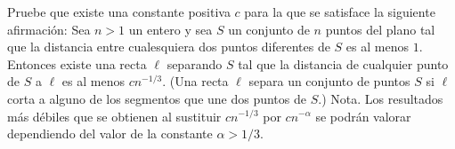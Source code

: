 Pruebe que existe una constante positiva $c$ para la que se satisface la siguiente afirmación:
Sea $n \gt 1$ un entero y sea $S$ un conjunto de $n$ puntos del plano tal que la distancia entre cualesquiera dos puntos diferentes de $S$ es al menos $1$. Entonces existe una recta $\ell$ separando $S$ tal que la distancia de cualquier punto de $S$ a $\ell$ es al menos $cn^{−1/3}$.
(Una recta $\ell$ separa un conjunto de puntos $S$ si $\ell$ corta a alguno de los segmentos que une dos puntos de $S$.)
Nota. Los resultados más débiles que se obtienen al sustituir $cn^{−1/3}$ por $cn^{−\alpha}$ se podrán valorar dependiendo del valor de la constante $\alpha \gt 1/3$.